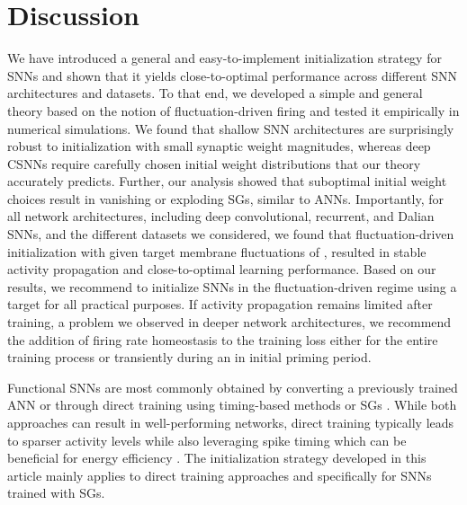 \documentclass[11pt,a4paper]{article}
\begin{document}
\section*{Discussion}



We have introduced a general and easy-to-implement initialization strategy for \acp{SNN} and shown that it yields close-to-optimal performance across different \ac{SNN} architectures and datasets. 
To that end, we developed a simple and general theory based on the notion of fluctuation-driven firing and tested it empirically in numerical simulations.
We found that shallow \ac{SNN} architectures are surprisingly robust to initialization with small synaptic weight magnitudes, whereas deep \acp{CSNN} require carefully chosen initial weight distributions that our theory accurately predicts. 
Further, our analysis showed that suboptimal initial weight choices result in vanishing or exploding \acp{SG}, similar to \acp{ANN}.
Importantly, for all network architectures, including deep convolutional, recurrent, and Dalian \acp{SNN}, and the different datasets we considered, we found that fluctuation-driven initialization with given target membrane fluctuations of , resulted in stable activity propagation and close-to-optimal learning performance. 
Based on our results, we recommend to initialize \acp{SNN} in the fluctuation-driven regime using a target  for all practical purposes.
If activity propagation remains limited after training, a problem we observed in deeper network architectures, we recommend the addition of firing rate homeostasis to the training loss either for the entire training process or transiently during an in initial priming period.

\medskip

Functional \acp{SNN} are most commonly obtained by converting a previously trained ANN \citep{Esser2015-mi,Hunsberger2016-em,Cao2015-yt,OConnor2013-uo,Bu2022-ab} or through direct training using timing-based methods \citep{Bohte2002,booij_gradient_2005, Mostafa2018,Kheradpisheh2020, Comsa2020} or \acp{SG} \citep{Zenke2018-id,Zenke2021-zg,Neftci2019-ie}. 
While both approaches can result in well-performing networks, direct training typically leads to sparser activity levels while also leveraging spike timing which can be beneficial for energy efficiency \citep{davidson_comparison_2021}. 
The initialization strategy developed in this article mainly applies to direct training approaches and specifically for \acp{SNN} trained with \acp{SG}. 
\end{document}
